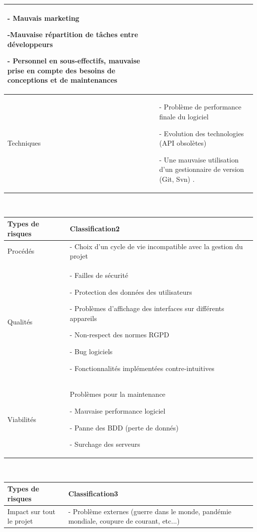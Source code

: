\documentclass[12pt]{article}
\begin{document}
\begin{itemize}
\begin{tabular}{|p{3.5cm}|p{8cm}|}
		- Mauvais marketing
		
		-Mauvaise répartition de tâches entre développeurs
		
		- Personnel en sous-effectifs, mauvaise prise en compte des besoins de conceptions et de maintenances
		 \tabularnewline  
		\hline  
		\raggedleft Techniques & - Problème de performance finale du logiciel
		
		- Evolution des technologies (API obsolètes)
		
		- Une mauvaise utilisation d’un gestionnaire de    version (Git, Svn)
		. \tabularnewline 
		\hline 
	\end{tabular}\\
	\begin{tabular}{|p{3.5cm}|p{8cm}|} 
		\hline  
		\centering Types de risques & \raggedright  Classification2 \tabularnewline  
		\hline
		\raggedleft Procédés&  - Choix d’un cycle de vie incompatible avec la gestion du projet\tabularnewline  
		\hline  
		\raggedleft Qualités & - Failles de sécurité
		
		- Protection des données des utilisateurs
		
		- Problèmes d’affichage des interfaces sur différents appareils
		
		- Non-respect des normes RGPD
		
		- Bug logiciels
		
		- Fonctionnalités implémentées contre-intuitives
		 \tabularnewline  
		\hline  
		\raggedleft Viabilités & Problèmes pour la maintenance
		
		- Mauvaise performance logiciel
		
		- Panne des BDD (perte de donnés)
		
		- Surchage des serveurs
		\tabularnewline 
		\hline 
	\end{tabular}\\
	\begin{tabular}{|p{3.5cm}|p{8cm}|} 
		\hline  
		\centering Types de risques & \raggedright  Classification3 \tabularnewline  
		\hline
		\raggedleft Impact sur tout le projet& - Problème externes (guerre dans le monde, pandémie mondiale, coupure de courant, etc...)
		\tabularnewline  
		\hline  
	\end{tabular}
	
	
\end{itemize}
\end{document}
